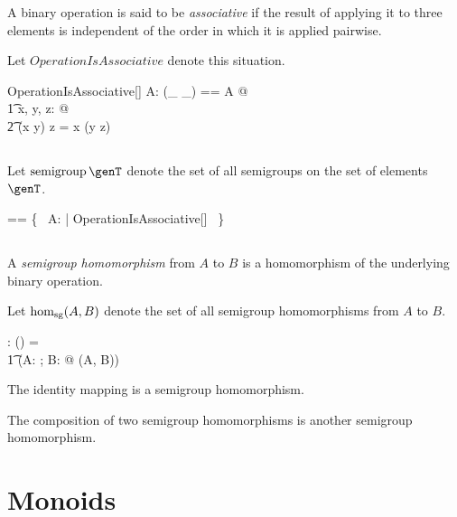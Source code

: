 \documentclass{amsart}
\begin{document}
A binary operation is said to be {\em associative} if the result of applying it to three elements
is independent of the order in which it is applied pairwise.

Let $OperationIsAssociative$ denote this situation.

\begin{schema}{OperationIsAssociative}[\genT]
A: \binop \genT
\where
\LET (\_ \mulG \_) == A @ \\
\t1	\forall x, y, z: \genT @ \\
\t2		(x \mulG y) \mulG z = x \mulG (y \mulG z)
\end{schema}

\subsection{}

Let $\semigroup \genT$ denote the set of all semigroups on the set of elements $\genT$.

\begin{zed}
\semigroup \genT == \{~ A: \binop \genT | OperationIsAssociative[\genT] ~\}
\end{zed}

\subsection{}

A {\em semigroup homomorphism} from $A$ to $B$ is a homomorphism of the underlying binary operation.

Let $\operatorname{hom_{sg}}(A, B)$ denote the set of all semigroup homomorphisms from $A$ to $B$.

\begin{gendef}[\genT, \genU]
\homSemigroup: \semigroup \genT \cross \semigroup \genU \fun \power (\genT \pfun \genU)
\where
\homSemigroup = \\
\t1	(\lambda A: \semigroup \genT; B: \semigroup \genU @ \homBinOp(A, B))
\end{gendef}

\begin{remark}
The identity mapping is a semigroup homomorphism.
\end{remark}

\begin{remark}
The composition of two semigroup homomorphisms is another semigroup homomorphism.
\end{remark}

\section{Monoids}
\end{document}
